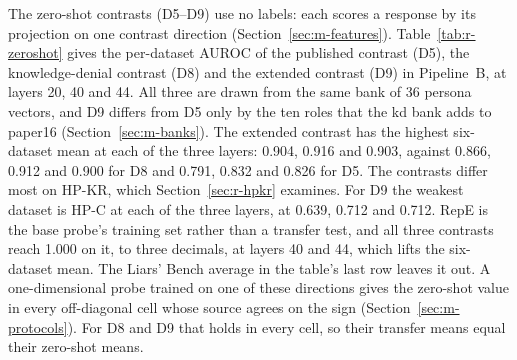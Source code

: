The zero-shot contrasts (D5--D9) use no labels: each scores a response by its projection on one contrast direction (Section~\ref{sec:m-features}).
Table~\ref{tab:r-zeroshot} gives the per-dataset AUROC of the published contrast (D5), the knowledge-denial contrast (D8) and the extended contrast (D9) in Pipeline~B, at layers 20, 40 and 44. %
All three are drawn from the same bank of 36 persona vectors, and D9 differs from D5 only by the ten roles that the kd bank adds to paper16 (Section~\ref{sec:m-banks}). %
The extended contrast has the highest six-dataset mean at each of the three layers: 0.904, 0.916 and 0.903, against 0.866, 0.912 and 0.900 for D8 and 0.791, 0.832 and 0.826 for D5. %
The contrasts differ most on HP-KR, which Section~\ref{sec:r-hpkr} examines. %
For D9 the weakest dataset is HP-C at each of the three layers, at 0.639, 0.712 and 0.712. %
RepE is the base probe's training set rather than a transfer test, and all three contrasts reach 1.000 on it, to three decimals, at layers 40 and 44, which lifts the six-dataset mean. %
The Liars' Bench average in the table's last row leaves it out.
A one-dimensional probe trained on one of these directions gives the zero-shot value in every off-diagonal cell whose source agrees on the sign (Section~\ref{sec:m-protocols}).
For D8 and D9 that holds in every cell, so their transfer means equal their zero-shot means. %

